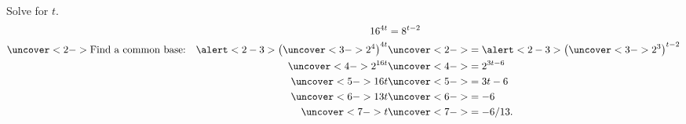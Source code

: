 \begin{frame}
\begin{example}
Solve for $t$.  
\begin{align*}
16^{4t} & = 8^{t-2} \\
\uncover<2->{\text{Find a common base:}\quad \alert<2-3>{\big( \uncover<3->{2^4}\big)}^{4t}} & \uncover<2->{ = \alert<2-3>{\big( \uncover<3->{2^3}\big)}^{t-2} } \\
\uncover<4->{2^{16t}} & \uncover<4->{ = 2^{3t-6}} \\
\uncover<5->{16t} & \uncover<5->{ = 3t - 6} \\
\uncover<6->{13t} & \uncover<6->{ =  -6} \\
\uncover<7->{t} & \uncover<7->{ =  -6/13.} 
\end{align*}
\end{example}
\end{frame}

